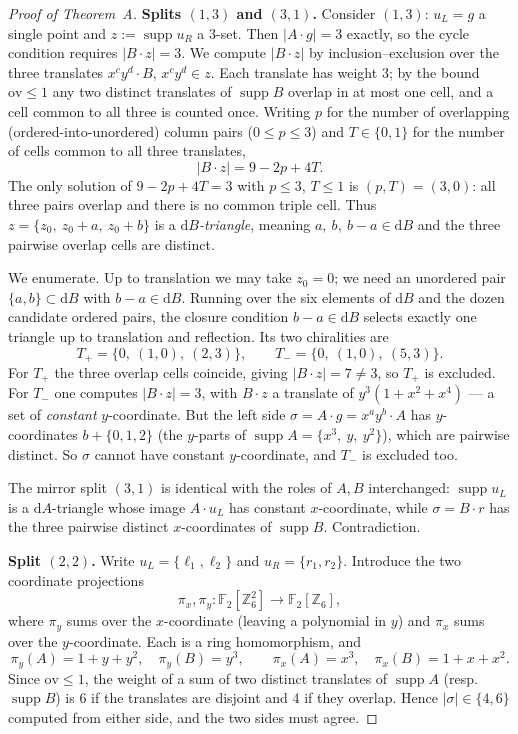 \documentclass[11pt]{article}
\newcommand{\Z}{\mathbb{Z}}
\newcommand{\F}[1]{\mathbb{F}_{#1}}
\newcommand{\wt}[1]{\lvert #1\rvert}
\DeclareMathOperator{\supp}{supp}
\theoremstyle{plain}
\theoremstyle{definition}
\theoremstyle{remark}
\begin{document}
\begin{proof}[Proof of Theorem~A]
\medskip
\noindent\textbf{Splits $(1,3)$ and $(3,1)$.}
Consider $(1,3)$: $u_L=g$ a single point and $z:=\supp u_R$ a $3$-set. Then
$\wt{A\cdot g}=3$ exactly, so the cycle condition requires $\wt{B\cdot z}=3$. We compute
$\wt{B\cdot z}$ by inclusion--exclusion over the three translates $x^c y^d\cdot B$,
$x^c y^d\in z$. Each translate has weight $3$; by the bound $\mathrm{ov}\le1$ any two
distinct translates of $\supp B$ overlap in at most one cell, and a cell common to all
three is counted once. Writing $p$ for the number of overlapping (ordered-into-unordered)
column pairs ($0\le p\le 3$) and $T\in\{0,1\}$ for the number of cells common to all three
translates,
\[
  \wt{B\cdot z}=9-2p+4T .
\]
The only solution of $9-2p+4T=3$ with $p\le3$, $T\le1$ is $(p,T)=(3,0)$: all three pairs
overlap and there is no common triple cell. Thus $z=\{z_0,\ z_0+a,\ z_0+b\}$ is a
\emph{$\mathrm dB$-triangle}, meaning $a,\ b,\ b-a\in\mathrm dB$ and the three pairwise
overlap cells are distinct.

We enumerate. Up to translation we may take $z_0=0$; we need an unordered pair
$\{a,b\}\subset\mathrm dB$ with $b-a\in\mathrm dB$. Running over the six elements of
$\mathrm dB$ and the dozen candidate ordered pairs, the closure condition $b-a\in\mathrm dB$
selects exactly one triangle up to translation and reflection. Its two chiralities are
\[
  T_{+}=\{0,\ (1,0),\ (2,3)\},\qquad T_{-}=\{0,\ (1,0),\ (5,3)\}.
\]
For $T_{+}$ the three overlap cells coincide, giving $\wt{B\cdot z}=7\ne 3$, so $T_{+}$ is
excluded. For $T_{-}$ one computes $\wt{B\cdot z}=3$, with $B\cdot z$ a translate of
$y^3(1+x^2+x^4)$ --- a set of \emph{constant} $y$-coordinate. But the left side
$\sigma=A\cdot g=x^a y^b\cdot A$ has $y$-coordinates $b+\{0,1,2\}$ (the $y$-parts of
$\supp A=\{x^3,\ y,\ y^2\}$), which are pairwise distinct. So $\sigma$ cannot have constant
$y$-coordinate, and $T_{-}$ is excluded too.

The mirror split $(3,1)$ is identical with the roles of $A,B$ interchanged: $\supp u_L$ is a
$\mathrm dA$-triangle whose image $A\cdot u_L$ has constant $x$-coordinate, while
$\sigma=B\cdot r$ has the three pairwise distinct $x$-coordinates of $\supp B$. Contradiction.

\medskip
\noindent\textbf{Split $(2,2)$.}
Write $u_L=\{\ell_1,\ell_2\}$ and $u_R=\{r_1,r_2\}$. Introduce the two coordinate
projections
\[
  \pi_x,\pi_y\colon\F2[\Z_6^2]\to\F2[\Z_6],
\]
where $\pi_y$ sums over the $x$-coordinate (leaving a polynomial in $y$) and $\pi_x$ sums
over the $y$-coordinate. Each is a ring homomorphism, and
\[
  \pi_y(A)=1+y+y^2,\quad \pi_y(B)=y^3,\qquad
  \pi_x(A)=x^3,\quad \pi_x(B)=1+x+x^2 .
\]
Since $\mathrm{ov}\le1$, the weight of a sum of two distinct translates of $\supp A$ (resp.\
$\supp B$) is $6$ if the translates are disjoint and $4$ if they overlap. Hence
$\wt{\sigma}\in\{4,6\}$ computed from either side, and the two sides must agree.


\end{proof}
\end{document}
